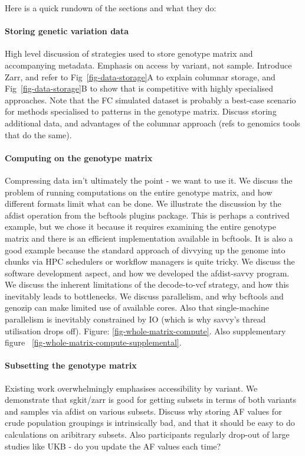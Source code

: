 \documentclass[a4paper,num-refs]{oup-contemporary}
\begin{document}
Here is a quick rundown of the sections and what they do:

\paragraph{Storing genetic variation data}
High level discussion of
strategies used to store genotype matrix and accompanying metadata.
Emphasis on access by variant, not sample. Introduce Zarr, and
refer to Fig~\ref{fig-data-storage}A to explain columnar storage,
and Fig~\ref{fig-data-storage}B to show that is competitive
with highly specialised approaches.
Note that the FC simulated dataset is probably a best-case
scenario for methods specialised to patterns in the genotype matrix.
Discuss storing additional data, and advantages of the
columnar approach (refs to genomics tools that do the same).

\paragraph{Computing on the genotype matrix}
Compressing data isn't ultimately the point - we want to use it.
We discuss the problem of running computations on the entire
genotype matrix, and how different formats limit what can be done.
We illustrate the discussion by the afdist operation from
the bcftools plugins package. This is perhaps a contrived example, but
we chose it because it requires examining the entire genotype matrix
and there is an efficient implementation available in bcftools.
It is also a good example because the standard approach of
divvying up the genome into chunks via HPC schedulers or workflow
managers is quite tricky.
We discuss the software development aspect, and how we developed
the afdist-savvy program. We discuss the inherent limitations
of the decode-to-vcf strategy, and how this inevitably
leads to bottlenecks. We discuss parallelism, and why
bcftools and genozip can make limited use of available cores.
Also that single-machine parallelism is inevitably constrained
by IO (which is why savvy's thread utilisation drops off).
Figure: \ref{fig-whole-matrix-compute}. Also
supplementary figure ~\ref{fig-whole-matrix-compute-supplemental}.

\paragraph{Subsetting the genotype matrix}
Existing work overwhelmingly emphasises accessibility by variant.
We demonstrate that sgkit/zarr is good for getting subsets
in terms of both variants and samples via afdist on various subsets.
Discuss why storing AF values for crude population groupings is
intrinsically bad, and that it should be easy to do calculations
on aribitrary subsets. Also participants regularly drop-out of
large studies like UKB - do you update the AF values each time?
\end{document}
